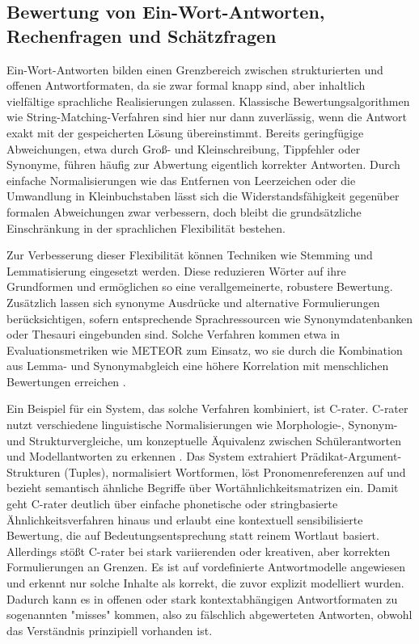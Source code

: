 \documentclass[a4paper,12pt]{article}
\begin{document}
\subsection{Bewertung von Ein-Wort-Antworten, Rechenfragen und Schätzfragen}
Ein-Wort-Antworten bilden einen Grenzbereich zwischen strukturierten und offenen Antwortformaten, da sie zwar formal knapp sind, aber inhaltlich vielfältige sprachliche Realisierungen zulassen. Klassische Bewertungsalgorithmen wie String-Matching-Verfahren sind hier nur dann zuverlässig, wenn die Antwort exakt mit der gespeicherten Lösung übereinstimmt. Bereits geringfügige Abweichungen, etwa durch Groß- und Kleinschreibung, Tippfehler oder Synonyme, führen häufig zur Abwertung eigentlich korrekter Antworten. Durch einfache Normalisierungen wie das Entfernen von Leerzeichen oder die Umwandlung in Kleinbuchstaben lässt sich die Widerstandsfähigkeit gegenüber formalen Abweichungen zwar verbessern, doch bleibt die grundsätzliche Einschränkung in der sprachlichen Flexibilität bestehen.

Zur Verbesserung dieser Flexibilität können Techniken wie Stemming und Lemmatisierung eingesetzt werden. Diese reduzieren Wörter auf ihre Grundformen und ermöglichen so eine verallgemeinerte, robustere Bewertung. Zusätzlich lassen sich synonyme Ausdrücke und alternative Formulierungen berücksichtigen, sofern entsprechende Sprachressourcen wie Synonymdatenbanken oder Thesauri eingebunden sind. Solche Verfahren kommen etwa in Evaluationsmetriken wie METEOR zum Einsatz, wo sie durch die Kombination aus Lemma- und Synonymabgleich eine höhere Korrelation mit menschlichen Bewertungen erreichen \parencite[Kapitel~35.6.2]{mitkov}.

Ein Beispiel für ein System, das solche Verfahren kombiniert, ist C-rater. C-rater nutzt verschiedene linguistische Normalisierungen wie Morphologie-, Synonym- und Strukturvergleiche, um konzeptuelle Äquivalenz zwischen Schülerantworten und Modellantworten zu erkennen \parencite[vgl.][S.~389ff.]{leacock}. Das System extrahiert Prädikat-Argument-Strukturen (Tuples), normalisiert Wortformen, löst Pronomenreferenzen auf und bezieht semantisch ähnliche Begriffe über Wortähnlichkeitsmatrizen ein. Damit geht C-rater deutlich über einfache phonetische oder stringbasierte Ähnlichkeitsverfahren hinaus und erlaubt eine kontextuell sensibilisierte Bewertung, die auf Bedeutungsentsprechung statt reinem Wortlaut basiert. Allerdings stößt C-rater bei stark variierenden oder kreativen, aber korrekten Formulierungen an Grenzen. Es ist auf vordefinierte Antwortmodelle angewiesen und erkennt nur solche Inhalte als korrekt, die zuvor explizit modelliert wurden. Dadurch kann es in offenen oder stark kontextabhängigen Antwortformaten zu sogenannten "misses" kommen, also zu fälschlich abgewerteten Antworten, obwohl das Verständnis prinzipiell vorhanden ist.
\end{document}

